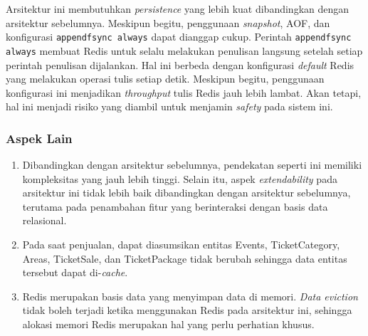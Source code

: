 Arsitektur ini membutuhkan \textit{persistence} yang lebih kuat dibandingkan dengan arsitektur sebelumnya. Meskipun begitu, penggunaan \textit{snapshot}, AOF, dan konfigurasi \texttt{appendfsync always} dapat dianggap cukup. Perintah \texttt{appendfsync always} membuat Redis untuk selalu melakukan penulisan langsung setelah setiap perintah penulisan dijalankan. Hal ini berbeda dengan konfigurasi \textit{default} Redis yang melakukan operasi tulis setiap detik. Meskipun begitu, penggunaan konfigurasi ini menjadikan \textit{throughput} tulis Redis jauh lebih lambat. Akan tetapi, hal ini menjadi risiko yang diambil untuk menjamin \textit{safety} pada sistem ini.

\subsubsection{Aspek Lain}

\begin{enumerate}
    \item Dibandingkan dengan arsitektur sebelumnya, pendekatan seperti ini memiliki kompleksitas yang jauh lebih tinggi. Selain itu, aspek \textit{extendability} pada arsitektur ini tidak lebih baik dibandingkan dengan arsitektur sebelumnya, terutama pada penambahan fitur yang berinteraksi dengan basis data relasional.
    \item Pada saat penjualan, dapat diasumsikan entitas Events, TicketCategory, Areas, TicketSale, dan TicketPackage tidak berubah sehingga data entitas tersebut dapat di-\textit{cache}.
    \item Redis merupakan basis data yang menyimpan data di memori. \textit{Data eviction} tidak boleh terjadi ketika menggunakan Redis pada arsitektur ini, sehingga alokasi memori Redis merupakan hal yang perlu perhatian khusus.
\end{enumerate}

